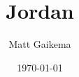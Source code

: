 \documentclass{article}
\title{Jordan}
\author{Matt Gaikema}
\date{\today}
\begin{document}
\maketitle

\jordan
\end{document}
